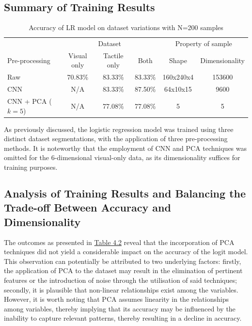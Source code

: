 \documentclass[11pt, a4paper]{report}
\begin{document}
\subsection{Summary of Training Results}\label{sec:4.5.1}
\label{sec:4.5.1}
\begin{table}[H]
    \centering
    \small
    \begin{tabular}{lccccc}
        \toprule
        & \multicolumn{3}{c}{Dataset} & \multicolumn{2}{c}{Property of sample} \\
        \cmidrule{2-4}\cmidrule{5-6}
        Pre-processing & Visual only & Tactile only & Both & Shape & Dimensionality \\
        \midrule
        Raw & 70.83\% & 83.33\% & 83.33\% & 160x240x4 & 153600 \\
        CNN & N/A & 83.33\% & 87.50\% & 64x10x15  & 9600 \\
        CNN + PCA ($k=5$) & N/A & 77.08\% & 77.08\% & 5 & 5\\
        \bottomrule
    \end{tabular}
    \caption{Accuracy of LR model on dataset variations with N=200 samples}
    \label{tbl:4.2}
\end{table}
As previously discussed, the logistic regression model was trained using three distinct dataset segmentations, with the application of three pre-processing methods. It is noteworthy that the employment of CNN and PCA techniques was omitted for the 6-dimensional visual-only data, as its dimensionality suffices for training purposes.


\newpage
\subsection{Analysis of Training Results and Balancing the Trade-off Between Accuracy and Dimensionality}\label{sec:4.5.2}
The outcomes as presented in \hyperref[tbl:4.2]{Table 4.2} reveal that the incorporation of PCA techniques did not yield a considerable impact on the accuracy of the logit model. This observation can potentially be attributed to two underlying factors: firstly, the application of PCA to the dataset may result in the elimination of pertinent features or the introduction of noise through the utilisation of said techniques; secondly, it is plausible that non-linear relationships exist among the variables. However, it is worth noting that PCA assumes linearity in the relationships among variables, thereby implying that its accuracy may be influenced by the inability to capture relevant patterns, thereby resulting in a decline in accuracy.\\
\end{document}
